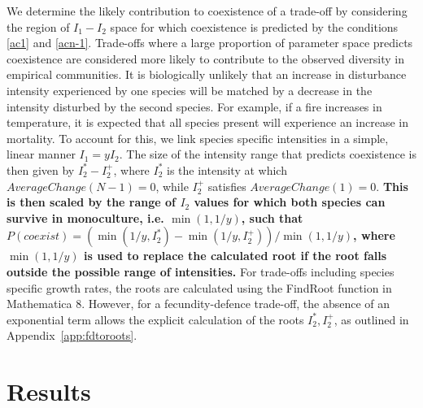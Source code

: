 \documentclass[a4paper]{article}
\begin{document}
We determine the  likely contribution to coexistence of a trade-off by considering the region of $I_1 - I_2$ space for which coexistence is predicted by the conditions \eqref{ac1} and \eqref{acn-1}. Trade-offs where a large proportion of parameter space predicts coexistence are considered more likely to contribute to the observed diversity in empirical communities. It is biologically unlikely that an increase in disturbance intensity experienced by one species will be matched by a decrease in the intensity disturbed by the second species. For example, if a fire increases in temperature, it is expected that all species present will experience an increase in mortality. To account for this, we link species specific intensities in a simple, linear manner $I_1=yI_2$. The size of the intensity range that predicts coexistence is then given by $I_2^* - I_2^+$, where $I_2^*$ is the intensity at which $AverageChange(N-1)=0$, while $I_2^+$ satisfies $AverageChange(1)=0$. \textbf{This is then scaled by the range of $I_2$ values for which both species can survive in monoculture, i.e. $\min(1,1/y)$, such that $P(coexist)=(\min(1/y,I_2^*) - \min(1/y,I_2^+))/\min(1,1/y)$, where $\min(1,1/y)$ is used to replace the calculated root if the root falls outside the possible range of intensities.} For trade-offs including species specific growth rates, the roots are calculated using the FindRoot function in Mathematica 8. However, for a fecundity-defence trade-off, the absence of an exponential term allows the explicit calculation of the roots $I_2^*,I_2^+$, as outlined in Appendix~\ref{app:fdtoroots}.

\section{Results} \label{results}
\end{document}
